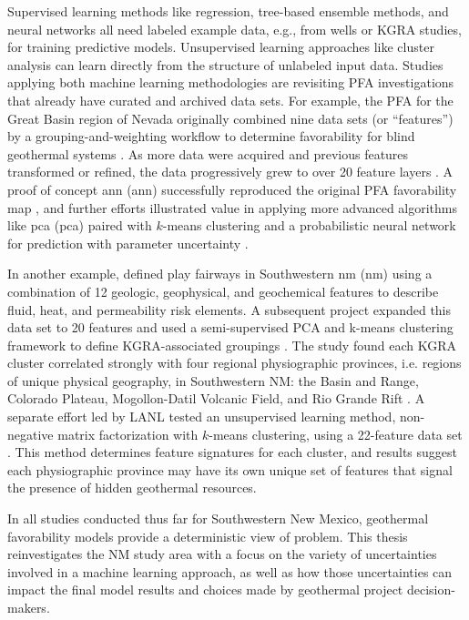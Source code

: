 Supervised learning methods like regression, tree-based ensemble methods, and neural networks all need labeled example data, e.g., from wells or KGRA studies, for training predictive models. Unsupervised learning approaches like cluster analysis can learn directly from the structure of unlabeled input data. Studies applying both machine learning methodologies are revisiting PFA investigations that already have curated and archived data sets. For example, the PFA for the Great Basin region of Nevada originally combined nine data sets (or ``features'') by a grouping-and-weighting workflow to determine favorability for blind geothermal systems \citep{faulds_progress_2017}. As more data were acquired and previous features transformed or refined, the data progressively grew to over 20 feature layers \citep{brown_machine_2020, faulds_discovering_2019}. A proof of concept \acrlong{ann} (\acrshort{ann}) successfully reproduced the original PFA favorability map \citep{brown_machine_2020}, and further efforts illustrated value in applying more advanced algorithms like \acrlong{pca} (\acrshort{pca}) paired with $k$-means clustering \citep{smith_characterizing_2021} and a probabilistic neural network for prediction with parameter uncertainty \citep{brown_personal_2021}.

In another example, \citet{bielicki_hydrogeolgic_2015} defined play fairways in Southwestern \acrlong{nm} (\acrshort{nm}) using a combination of 12 geologic, geophysical, and geochemical features to describe fluid, heat, and permeability risk elements. A subsequent project expanded this data set to 20 features and used a semi-supervised PCA and k-means clustering framework to define KGRA-associated groupings \citep{pepin_new_2019}. The study found each KGRA cluster correlated strongly with four regional physiographic provinces, i.e. regions of unique physical geography, in Southwestern NM: the Basin and Range, Colorado Plateau, Mogollon-Datil Volcanic Field, and Rio Grande Rift \citep{pepin_new_2019}. A separate effort led by LANL tested an unsupervised learning method, non-negative matrix factorization with $k$-means clustering, using a 22-feature data set \citep{vesselinov_discovering_2020}. This method determines feature signatures for each cluster, and results suggest each physiographic province may have its own unique set of features that signal the presence of hidden geothermal resources. 

In all studies conducted thus far for Southwestern New Mexico, geothermal favorability models provide a deterministic view of problem. This thesis reinvestigates the NM study area with a focus on the variety of uncertainties involved in a machine learning approach, as well as how those uncertainties can impact the final model results and choices made by geothermal project decision-makers.

